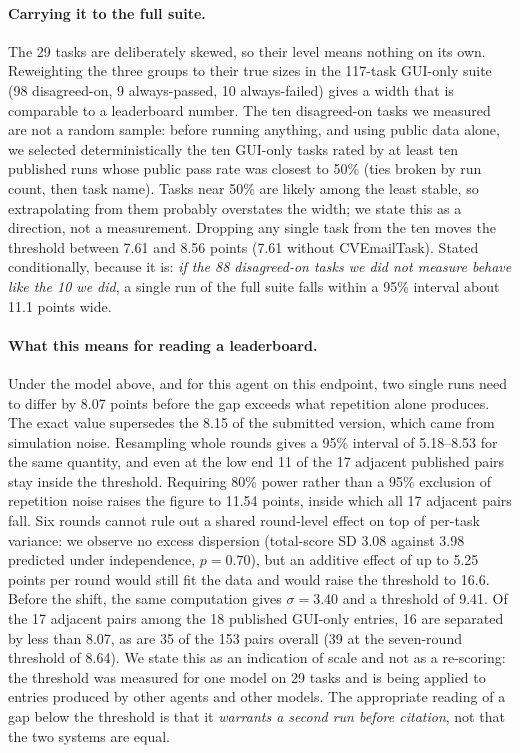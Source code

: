 \paragraph{Carrying it to the full suite.} The 29 tasks are deliberately
skewed, so their level means nothing on its own. Reweighting the three groups
to their true sizes in the 117-task GUI-only suite (98 disagreed-on, 9
always-passed, 10 always-failed) gives a width that is comparable to a
leaderboard number. The ten disagreed-on tasks we measured are not a random
sample: before running anything, and using public data alone, we selected
deterministically the ten GUI-only tasks rated by at least ten published runs
whose public pass rate was closest to 50\% (ties broken by run count, then task
name). Tasks near 50\% are likely among the least stable, so extrapolating
from them probably overstates the width; we state this as a direction, not a
measurement. Dropping any single task from the ten moves the threshold between
7.61 and 8.56 points (7.61 without CVEmailTask). Stated conditionally, because
it is: \emph{if the 88 disagreed-on tasks we did not measure behave like the 10
we did}, a single run of the full suite falls within a 95\% interval about
11.1 points wide.

\paragraph{What this means for reading a leaderboard.} Under the model above,
and for this agent on this endpoint, two single runs need to differ by 8.07
points before the gap exceeds what repetition alone produces. The exact value
supersedes the 8.15 of the submitted version, which came from simulation noise.
Resampling whole rounds gives a 95\% interval of 5.18--8.53 for the same
quantity, and even at the low end 11 of the 17 adjacent published pairs stay
inside the threshold. Requiring 80\% power rather than a 95\% exclusion of
repetition noise raises the figure to 11.54 points, inside which all 17
adjacent pairs fall. Six rounds cannot rule out a shared round-level effect on
top of per-task variance: we observe no excess dispersion (total-score SD 3.08
against 3.98 predicted under independence, $p = 0.70$), but an additive effect
of up to 5.25 points per round would still fit the data and would raise the
threshold to 16.6. Before the shift, the same computation gives $\sigma = 3.40$
and a threshold of 9.41. Of the 17 adjacent pairs among the 18 published
GUI-only entries, 16 are separated by less than 8.07, as are 35 of the 153
pairs overall (39 at the seven-round threshold of 8.64). We state this as an
indication of scale and not as a re-scoring: the threshold was measured for one
model on 29 tasks and is being applied to entries produced by other agents and
other models. The appropriate reading of a gap below the threshold is that it
\emph{warrants a second run before citation}, not that the two systems are
equal.

